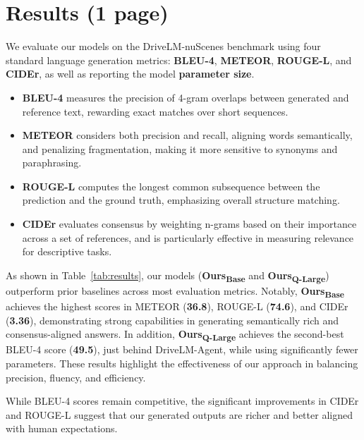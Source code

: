 \documentclass{article} %
\begin{document}
\section{ Results (1 page)}

We evaluate our models on the DriveLM-nuScenes benchmark using four standard language generation metrics: \textbf{BLEU-4}, \textbf{METEOR}, \textbf{ROUGE-L}, and \textbf{CIDEr}, as well as reporting the model \textbf{parameter size}.

\begin{itemize}
    \item \textbf{BLEU-4} measures the precision of 4-gram overlaps between generated and reference text, rewarding exact matches over short sequences.
    \item \textbf{METEOR} considers both precision and recall, aligning words semantically, and penalizing fragmentation, making it more sensitive to synonyms and paraphrasing.
    \item \textbf{ROUGE-L} computes the longest common subsequence between the prediction and the ground truth, emphasizing overall structure matching.
    \item \textbf{CIDEr} evaluates consensus by weighting n-grams based on their importance across a set of references, and is particularly effective in measuring relevance for descriptive tasks.
\end{itemize}

As shown in Table~\ref{tab:results}, our models (\textbf{Ours\textsubscript{Base}} and \textbf{Ours\textsubscript{Q-Large}}) outperform prior baselines across most evaluation metrics. Notably, \textbf{Ours\textsubscript{Base}} achieves the highest scores in METEOR (\textbf{36.8}), ROUGE-L (\textbf{74.6}), and CIDEr (\textbf{3.36}), demonstrating strong capabilities in generating semantically rich and consensus-aligned answers. In addition, \textbf{Ours\textsubscript{Q-Large}} achieves the second-best BLEU-4 score (\textbf{49.5}), just behind DriveLM-Agent, while using significantly fewer parameters. These results highlight the effectiveness of our approach in balancing precision, fluency, and efficiency.

While BLEU-4 scores remain competitive, the significant improvements in CIDEr and ROUGE-L suggest that our generated outputs are richer and better aligned with human expectations. 
\end{document}
